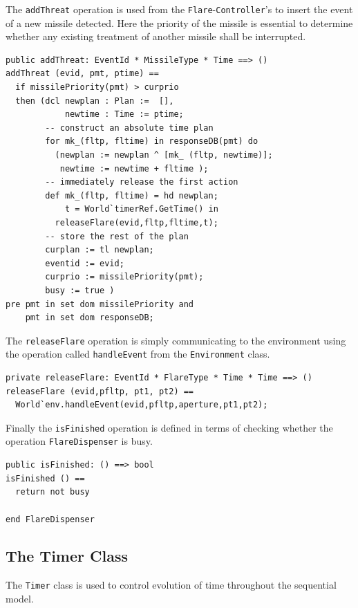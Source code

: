 \documentclass{overturerepchap}
\begin{document}
The \texttt{addThreat} operation is used from the
\texttt{Flare}-\texttt{Controller}'s  
to insert the event of a new missile detected. Here the priority of the
missile is essential to determine whether any existing treatment of another
missile shall be interrupted.

\begin{lstlisting}
public addThreat: EventId * MissileType * Time ==> ()
addThreat (evid, pmt, ptime) ==
  if missilePriority(pmt) > curprio
  then (dcl newplan : Plan :=  [],
            newtime : Time := ptime;
        -- construct an absolute time plan
        for mk_(fltp, fltime) in responseDB(pmt) do
          (newplan := newplan ^ [mk_ (fltp, newtime)];
           newtime := newtime + fltime );
        -- immediately release the first action
        def mk_(fltp, fltime) = hd newplan;
            t = World`timerRef.GetTime() in
          releaseFlare(evid,fltp,fltime,t);
        -- store the rest of the plan
        curplan := tl newplan;
        eventid := evid;
        curprio := missilePriority(pmt);
        busy := true )
pre pmt in set dom missilePriority and
    pmt in set dom responseDB;
\end{lstlisting}

The \texttt{releaseFlare} operation is simply communicating to the 
environment using the operation called \texttt{handleEvent} from the \texttt{Environment} 
class.

\begin{lstlisting}
private releaseFlare: EventId * FlareType * Time * Time ==> ()
releaseFlare (evid,pfltp, pt1, pt2) == 
  World`env.handleEvent(evid,pfltp,aperture,pt1,pt2);
\end{lstlisting}

Finally the \texttt{isFinished} operation is defined in terms of checking
whether the operation \texttt{FlareDispenser} is busy.

\begin{lstlisting}
public isFinished: () ==> bool
isFinished () == 
  return not busy

end FlareDispenser
\end{lstlisting}

\subsection{The Timer Class}\label{sec:timerclass}

The \texttt{Timer} class is used to control evolution of time
throughout the sequential model.
\end{document}
